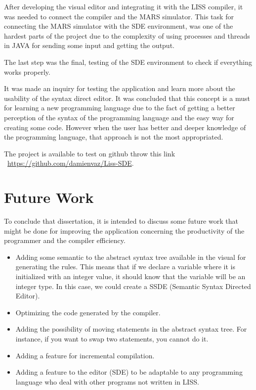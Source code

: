 \documentclass[
  oneside,
  11pt, a4paper,
  footinclude=true,
  headinclude=true,
  cleardoublepage=empty
]{scrbook}
\begin{document}
After developing the visual editor and integrating it with the LISS compiler, it was needed to connect the compiler and the MARS simulator. This task for connecting the MARS simulator with the SDE environment, was one of the hardest parts of the project due to the complexity of using processes and threads in JAVA for sending some input and getting the output.

The last step was the final, testing of the SDE environment to check if everything works properly.

It was made an inquiry for testing the application and learn more about the usability of the syntax direct editor. It was concluded that this concept is a must for learning a new programming language due to the fact of getting a better perception of the syntax of the programming language and the easy way for creating some code. However when the user has better and deeper knowledge of the programming language, that approach is not the most appropriated.

The project is available to test on github throw this link ~\url{https://github.com/damienvaz/Liss-SDE}.

\section{Future Work}

To conclude that dissertation, it is intended to discuss some future work that might be done for improving the application concerning the productivity of the programmer and the compiler efficiency.

\begin{itemize}
\item Adding some semantic to the abstract syntax tree available in the visual for generating the rules. This means that if we declare a variable where it is initialized with an integer value, it should know that the variable will be an integer type. In this case, we could create a SSDE (Semantic Syntax Directed Editor).
\item Optimizing the code generated by the compiler.
\item Adding the possibility of moving statements in the abstract syntax tree. For instance, if you want to swap two statements, you cannot do it.
\item Adding a feature for incremental compilation.
\item Adding a feature to the editor (SDE) to be adaptable to any programming language who deal with other programs not written in LISS.
\end{itemize}
\end{document}
